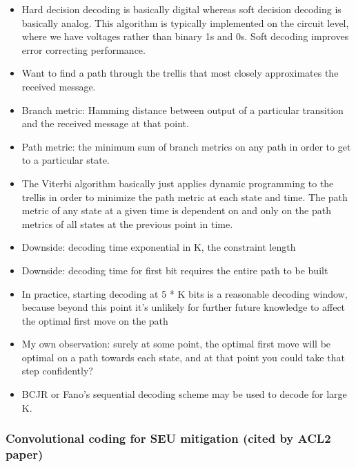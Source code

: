 \documentclass{article}
\begin{document}
\begin{itemize}
\item Hard decision decoding is basically digital whereas soft decision decoding
is basically analog. This algorithm is typically implemented on the
circuit level, where we have voltages rather than binary 1s and 0s. Soft
decoding improves error correcting performance.

\item Want to find a path through the trellis that most closely approximates the
received message.

\item Branch metric: Hamming distance between output of a particular transition
and the received message at that point.

\item Path metric: the minimum sum of branch metrics on any path in order to get
to a particular state.

\item The Viterbi algorithm basically just applies dynamic programming to the
trellis in order to minimize the path metric at each state and time. The
path metric of any state at a given time is dependent on and only on the
path metrics of all states at the previous point in time.

\item Downside: decoding time exponential in K, the constraint length

\item Downside: decoding time for first bit requires the entire path to be built

\item In practice, starting decoding at 5 * K bits is a reasonable decoding
window, because beyond this point it's unlikely for further future
knowledge to affect the optimal first move on the path

\item My own observation: surely at some point, the optimal first move will be
optimal on a path towards each state, and at that point you could take
that step confidently?

\item BCJR or Fano's sequential decoding scheme may be used to decode for large
K.
\end{itemize}

\subsubsection{Convolutional coding for SEU mitigation (cited by ACL2 paper)}
\end{document}
